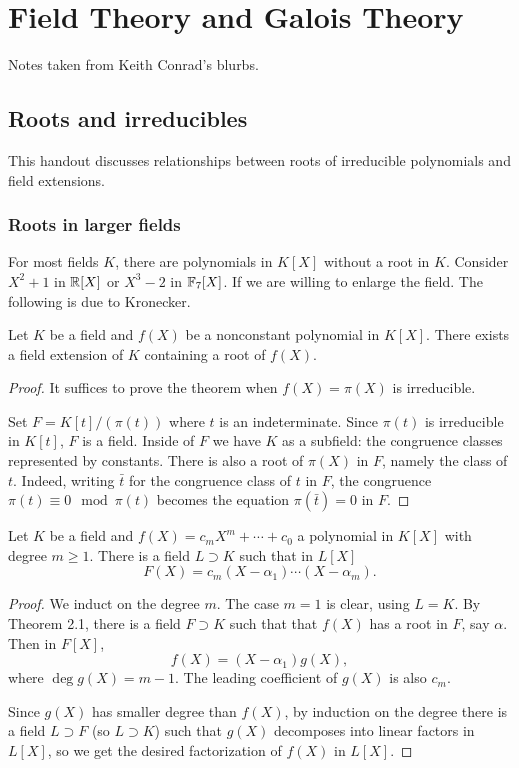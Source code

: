 \section{Field Theory and Galois Theory}
Notes taken from Keith Conrad's blurbs.

\subsection{Roots and irreducibles}
This handout discusses relationships between roots of irreducible
polynomials and field extensions.
\subsubsection{Roots in larger fields}
For most fields $K$, there are polynomials in $K[X]$ without a root in
$K$. Consider $X^2+1$ in $\mathbb{R}[X]$ or $X^3-2$ in $\mathbb{F}_7[X]$. If we are
willing to enlarge the field. The following is due to Kronecker.
\begin{theorem}
  Let $K$ be a field and $f(X)$ be a nonconstant polynomial in
  $K[X]$. There exists a field extension of $K$ containing a root of
  $f(X)$.
\end{theorem}
\begin{proof}
  It suffices to prove the theorem when $f(X)=\pi(X)$ is irreducible.

  Set $F=K[t]/(\pi(t))$ where $t$ is an indeterminate. Since $\pi(t)$ is
  irreducible in $K[t]$, $F$ is a field. Inside of $F$ we have $K$ as a
  subfield: the congruence classes represented by constants. There is also
  a root of $\pi(X)$ in $F$, namely the class of $t$. Indeed, writing $\bar
  t$ for the congruence class of $t$ in $F$, the congruence $\pi(t)\equiv
  0\mod \pi(t)$ becomes the equation $\pi(\bar t)=0$ in $F$.
\end{proof}

\begin{corollary}
  Let $K$ be a field and $f(X)=c_mX^m+\cdots+c_0$ a polynomial in $K[X]$
  with degree $m\geq 1$. There is a field $L\supset K$ such that in $L[X]$
  \[
    F(X)=c_m(X-\alpha_1)\cdots(X-\alpha_m).
  \]
\end{corollary}
\begin{proof}
  We induct on the degree $m$. The case $m=1$ is clear, using $L=K$. By
  Theorem 2.1, there is a field $F\supset K$ such that that $f(X)$ has a
  root in $F$, say $\alpha$. Then in $F[X]$,
  \[
    f(X)=(X-\alpha_1)g(X),
  \]
  where $\deg g(X)=m-1$. The leading coefficient of $g(X)$ is also $c_m$.

  Since $g(X)$ has smaller degree than $f(X)$, by induction on the degree
  there is a field $L\supset F$ (so $L\supset K$) such that $g(X)$
  decomposes into linear factors in $L[X]$, so we get the desired
  factorization of $f(X)$ in $L[X]$.
\end{proof}

